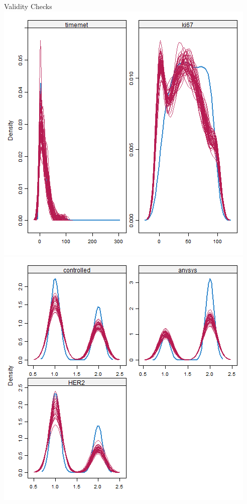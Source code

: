 \begin{frame}{Validity Checks}
\includegraphics[width=.5\textwidth]{cont_densplot}%
\includegraphics[width=.5\textwidth]{discrete_densplot} 
\end{frame}


